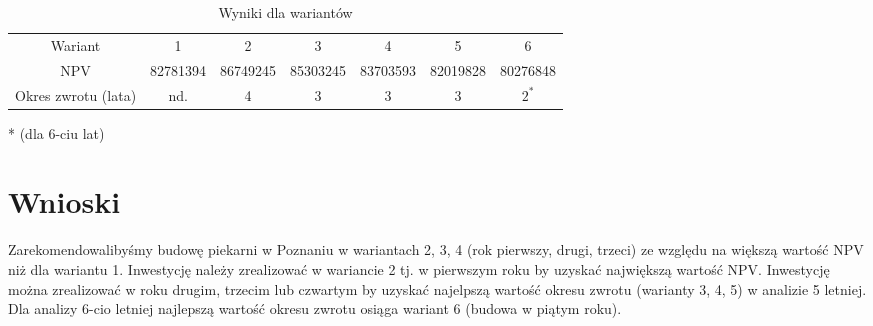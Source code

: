\documentclass[a4paper]{article}
\begin{document}
\begin{table}[H]
\centering
\begin{tabular}{ccccccc}
Wariant	& 1 & 2 & 3 & 4 & 5 & 6\\
NPV & 82781394 & 86749245 &	85303245 & 83703593 & 82019828 & 80276848\\
Okres zwrotu (lata) & nd. &	4 & 3 & 3 & 3 & $2^*$\\
\end{tabular}
\caption{Wyniki dla wariantów}
\label{tab:wyniki}
\end{table}
* (dla 6-ciu lat)
\section{Wnioski}
Zarekomendowalibyśmy budowę piekarni w Poznaniu w wariantach 2, 3, 4 (rok pierwszy, drugi, trzeci) ze względu na większą wartość NPV niż dla wariantu 1. Inwestycję należy zrealizować w wariancie 2 tj. w pierwszym roku by uzyskać największą wartość NPV. Inwestycję można zrealizować w roku drugim, trzecim lub czwartym by uzyskać najelpszą wartość okresu zwrotu (warianty 3, 4, 5) w analizie 5 letniej. Dla analizy 6-cio letniej najlepszą wartość okresu zwrotu osiąga wariant 6 (budowa w piątym roku). 
{}

\end{document}
